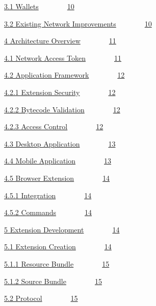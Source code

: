 \documentclass[]{article}
\begin{document}
{\protect\hyperlink{h.srw4riftwl36}{3.1
Wallets}}{~~~~~~~~}{\protect\hyperlink{h.srw4riftwl36}{10}}

{\protect\hyperlink{h.8ipfphadgub8}{3.2 Existing Network
Improvements}}{~~~~~~~~}{\protect\hyperlink{h.8ipfphadgub8}{10}}

{\protect\hyperlink{h.38hgs7qfpv00}{4 Architecture
Overview}}{~~~~~~~~}{\protect\hyperlink{h.38hgs7qfpv00}{11}}

{\protect\hyperlink{h.tje5l2r0ezdi}{4.1 Network Access
Token}}{~~~~~~~~}{\protect\hyperlink{h.tje5l2r0ezdi}{11}}

{\protect\hyperlink{h.f027vztofm4i}{4.2 Application
Framework}}{~~~~~~~~}{\protect\hyperlink{h.f027vztofm4i}{12}}

{\protect\hyperlink{h.di1w8p4vjbj0}{4.2.1 Extension
Security}}{~~~~~~~~}{\protect\hyperlink{h.di1w8p4vjbj0}{12}}

{\protect\hyperlink{h.tjw69hzdzn50}{4.2.2 Bytecode
Validation}}{~~~~~~~~}{\protect\hyperlink{h.tjw69hzdzn50}{12}}

{\protect\hyperlink{h.10usjkssy6lf}{4.2.3 Access
Control}}{~~~~~~~~}{\protect\hyperlink{h.10usjkssy6lf}{12}}

{\protect\hyperlink{h.sbit2az1gf9l}{4.3 Desktop
Application}}{~~~~~~~~}{\protect\hyperlink{h.sbit2az1gf9l}{13}}

{\protect\hyperlink{h.usp0cwy1jwzu}{4.4 Mobile
Application}}{~~~~~~~~}{\protect\hyperlink{h.usp0cwy1jwzu}{13}}

{\protect\hyperlink{h.d354z2kuj099}{4.5 Browser
Extension}}{~~~~~~~~}{\protect\hyperlink{h.d354z2kuj099}{14}}

{\protect\hyperlink{h.uc9770gpc7sj}{4.5.1
Integration}}{~~~~~~~~}{\protect\hyperlink{h.uc9770gpc7sj}{14}}

{\protect\hyperlink{h.w86r6j8myktj}{4.5.2
Commands}}{~~~~~~~~}{\protect\hyperlink{h.w86r6j8myktj}{14}}

{\protect\hyperlink{h.s3w09nisgji0}{5 Extension
Development}}{~~~~~~~~}{\protect\hyperlink{h.s3w09nisgji0}{14}}

{\protect\hyperlink{h.vtwavmt7boqd}{5.1 Extension
Creation}}{~~~~~~~~}{\protect\hyperlink{h.vtwavmt7boqd}{14}}

{\protect\hyperlink{h.58bq6hrt384h}{5.1.1 Resource
Bundle}}{~~~~~~~~}{\protect\hyperlink{h.58bq6hrt384h}{15}}

{\protect\hyperlink{h.fyix8o971n5b}{5.1.2 Source
Bundle}}{~~~~~~~~}{\protect\hyperlink{h.fyix8o971n5b}{15}}

{\protect\hyperlink{h.we7809azv8r3}{5.2
Protocol}}{~~~~~~~~}{\protect\hyperlink{h.we7809azv8r3}{15}}
\end{document}
